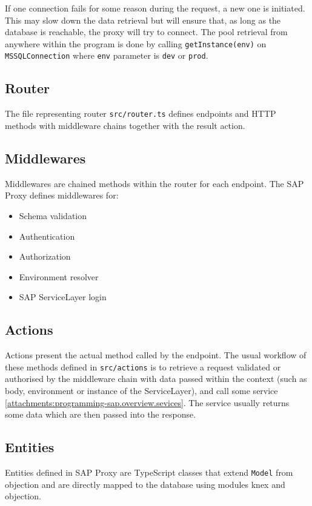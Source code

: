 If one connection fails for some reason during the request, a new one is initiated.
This may slow down the data retrieval but will ensure that, as long as the database is reachable, the proxy will try to connect.
The pool retrieval from anywhere within the program is done by calling \texttt{getInstance(env)} on \texttt{MSSQLConnection} where \texttt{env} parameter is \texttt{dev} or \texttt{prod}.

\subsection{Router}
The file representing router \texttt{src/router.ts} defines endpoints and HTTP methods with middleware chains together with the result action.

\subsection{Middlewares}
Middlewares are chained methods within the router for each endpoint.
The SAP Proxy defines middlewares for:
\begin{itemize}
    \item Schema validation
    \item Authentication
    \item Authorization
    \item Environment resolver
    \item SAP ServiceLayer login
\end{itemize}

\subsection{Actions}
Actions present the actual method called by the endpoint.
The usual workflow of these methods defined in \texttt{src/actions} is to retrieve a request validated or authorised by the middleware chain with data passed within the context (such as body, environment or instance of the ServiceLayer), and call some service \ref{attachments:programming-sap.overview.sevices}.
The service usually returns some data which are then passed into the response.

\subsection{Entities}
Entities defined in SAP Proxy are TypeScript classes that extend \texttt{Model} from \gls{objection} and are directly mapped to the database using modules \gls{knex} and \gls{objection}.

